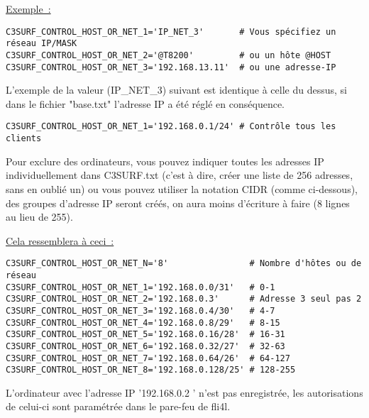 \begin{itemize}
\begin{description}
\underline{Exemple~:}

\begin{example}
\begin{verbatim}
C3SURF_CONTROL_HOST_OR_NET_1='IP_NET_3'       # Vous spécifiez un réseau IP/MASK
C3SURF_CONTROL_HOST_OR_NET_2='@T8200'         # ou un hôte @HOST
C3SURF_CONTROL_HOST_OR_NET_3='192.168.13.11'  # ou une adresse-IP
\end{verbatim}
\end{example}

L'exemple de la valeur (IP\_NET\_3) suivant est identique à celle du dessus,
si dans le fichier "base.txt" l'adresse IP a été réglé en conséquence.

\begin{example}
\begin{verbatim}
C3SURF_CONTROL_HOST_OR_NET_1='192.168.0.1/24' # Contrôle tous les clients
\end{verbatim}
\end{example}

Pour exclure des ordinateurs, vous pouvez indiquer toutes les adresses IP
individuellement dans C3SURF.txt (c'est à dire, créer une liste de 256 adresses,
sans en oublié un) ou vous pouvez utiliser la notation CIDR (comme ci-dessous),
des groupes d'adresse IP seront créés, on aura moins d'écriture à faire
(8 lignes au lieu de 255).

\underline{Cela ressemblera à ceci~:}

\begin{example}
\begin{verbatim}
C3SURF_CONTROL_HOST_OR_NET_N='8'                # Nombre d'hôtes ou de réseau
C3SURF_CONTROL_HOST_OR_NET_1='192.168.0.0/31'   # 0-1
C3SURF_CONTROL_HOST_OR_NET_2='192.168.0.3'      # Adresse 3 seul pas 2
C3SURF_CONTROL_HOST_OR_NET_3='192.168.0.4/30'   # 4-7
C3SURF_CONTROL_HOST_OR_NET_4='192.168.0.8/29'   # 8-15
C3SURF_CONTROL_HOST_OR_NET_5='192.168.0.16/28'  # 16-31
C3SURF_CONTROL_HOST_OR_NET_6='192.168.0.32/27'  # 32-63
C3SURF_CONTROL_HOST_OR_NET_7='192.168.0.64/26'  # 64-127
C3SURF_CONTROL_HOST_OR_NET_8='192.168.0.128/25' # 128-255
\end{verbatim}
\end{example}


L'ordinateur avec l'adresse IP '192.168.0.2 ' n'est pas enregistrée,
les autorisations de celui-ci sont paramétrée dans le pare-feu de fli4l.



\end{description}
\end{itemize}
